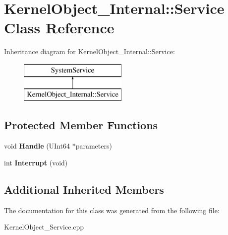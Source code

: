 \hypertarget{class_kernel_object___internal_1_1_service}{}\section{Kernel\+Object\+\_\+\+Internal\+:\+:Service Class Reference}
\label{class_kernel_object___internal_1_1_service}
Inheritance diagram for Kernel\+Object\+\_\+\+Internal\+:\+:Service\+:\begin{figure}[H]
\begin{center}
\leavevmode
\includegraphics[height=2.000000cm]{class_kernel_object___internal_1_1_service}
\end{center}
\end{figure}
\subsection*{Protected Member Functions}
\begin{DoxyCompactItemize}
\item 
\mbox{\label{class_kernel_object___internal_1_1_service_af20fb4175c982a9da56201c4f4dcf5b7}} 
void {\bfseries Handle} (U\+Int64 $\ast$parameters)
\item 
\mbox{\label{class_kernel_object___internal_1_1_service_acbdd53aec77300e58f304440e1cbb5e8}} 
int {\bfseries Interrupt} (void)
\end{DoxyCompactItemize}
\subsection*{Additional Inherited Members}


The documentation for this class was generated from the following file\+:\begin{DoxyCompactItemize}
\item 
Kernel\+Object\+\_\+\+Service.\+cpp\end{DoxyCompactItemize}
